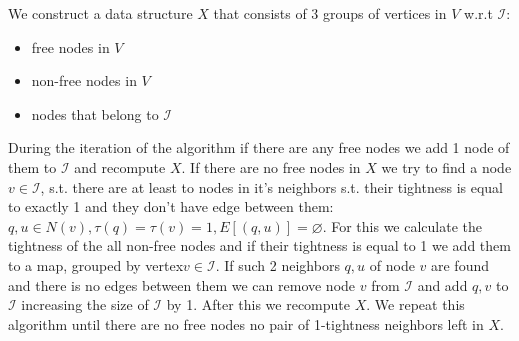We construct a data structure $X$ that consists of 3 groups of vertices in $V$ w.r.t $\mathcal{I}$:
\begin{itemize}
    \item free nodes in $V$
    \item non-free nodes in $V$
    \item nodes that belong to $\mathcal{I}$
\end{itemize}

During the iteration of the algorithm if there are any free nodes we add 1 node of them to $\mathcal{I}$ and recompute $X$. If there are no free nodes in $X$ we try to find a node $v \in \mathcal{I}$, s.t. there are at least to nodes in it's neighbors s.t. their tightness is equal to exactly 1 and they don't have edge between them: $q,u \in N(v), \tau(q) = \tau(v) = 1, E[(q,u)] = \varnothing$. For this we calculate the tightness of the all non-free nodes and if their tightness is equal to 1 we add them to a map, grouped by vertex$v \in \mathcal{I}$. If such 2 neighbors $q,u$ of node $v$ are found and there is no edges between them we can remove node $v$ from $\mathcal{I}$ and add $q,v$ to $\mathcal{I}$ increasing the size of $\mathcal{I}$ by 1. After this we recompute $X$.
We repeat this algorithm until there are no free nodes no pair of 1-tightness neighbors left in $X$. 

